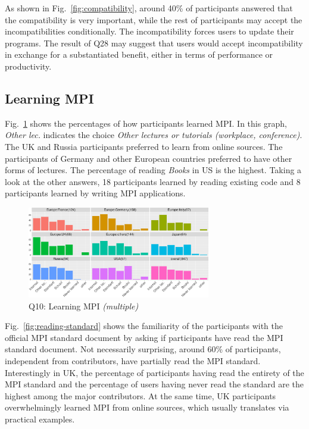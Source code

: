 \documentclass[preprint,5p,times]{elsarticle}
\def\myquote#1{{\it #1}}
\newcommand{\revision}[2]{{\color{blue}#2}}
\def\countries{contributors\xspace{}}%
\def\mcountries{major contributors\xspace{}}%
\begin{document}
As shown in Fig.~\ref{fig:compatibility}, around 40\% of participants answered
that the compatibility is very important, while the rest of participants may
accept the \revision{incompatibility}{incompatibilities} conditionally. The incompatibility forces users to
update their programs. The result of Q28 may \revision{suggests}{suggest} that users would accept
incompatibility in exchange \revision{of}{for} a substantiated benefit, either in terms of
performance or productivity.

\subsection{Learning MPI}\label{sec:learning-mpi}

Fig.~\ref{fig:learning-mpi} shows the percentages of how participants learned
MPI. In this graph, \myquote{Other lec.} indicates the choice \myquote{Other
lectures or tutorials (workplace, conference)}. The UK and Russia participants
preferred to learn from online sources. The participants of Germany and other
European countries preferred to have other forms of lectures. The percentage of
reading \myquote{Books} in US is the highest. Taking a look at the other
answers, 18 participants learned by reading existing code and 8 participants
learned by writing MPI applications.

\begin{figure}[tb]
\begin{center}
\includegraphics[width=8.0cm]{R-scripts/Q10.pdf}
\vspace{-1.5mm}
\caption{Q10: Learning MPI {\it(multiple)}}
\label{fig:learning-mpi}
\vspace{-3mm}%
\end{center}
\end{figure}

Fig.~\ref{fig:reading-standard} shows the familiarity of the participants with
the official MPI standard document by asking if participants have read the MPI
standard document. Not necessarily surprising, around 60\% of participants,
independent from \countries, have partially read the MPI standard. Interestingly
in UK, \revision{the percentage of participants having read the entirety of the MPI
standard is similar to the percentage of users having never read the
standard.}
{the percentage of participants having read the entirety of the MPI
standard and the percentage of users having never read the
standard are the highest among the \mcountries.}
\revision{In}{At the} same time, UK participants overwhelmingly learned MPI from online sources,
which usually translates via practical examples.
\end{document}
